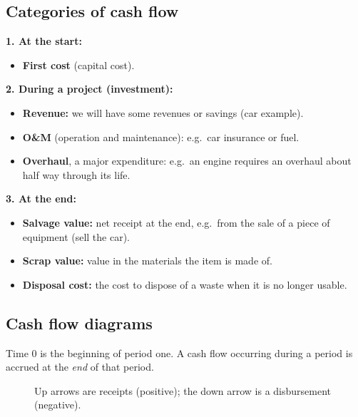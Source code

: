 \documentclass[11pt]{article}
\newcommand{\term}[1]{\textbf{\textcolor{cTerm}{#1}}}
\begin{document}
\subsection*{Categories of cash flow}

\textbf{1. At the start:}
\begin{itemize}[nosep]
  \item \term{First cost} (capital cost).
\end{itemize}

\textbf{2. During a project (investment):}
\begin{itemize}[nosep]
  \item \term{Revenue:} we will have some revenues or savings (car example).
  \item \term{O\&M} (operation and maintenance): e.g.\ car insurance or fuel.
  \item \term{Overhaul}, a major expenditure: e.g.\ an engine requires an
        overhaul about half way through its life.
\end{itemize}

\textbf{3. At the end:}
\begin{itemize}[nosep]
  \item \term{Salvage value:} net receipt at the end, e.g.\ from the sale of a
        piece of equipment (sell the car).
  \item \term{Scrap value:} value in the materials the item is made of.
  \item \term{Disposal cost:} the cost to dispose of a waste when it is no
        longer usable.
\end{itemize}

\subsection*{Cash flow diagrams}
Time $0$ is the beginning of period one. A cash flow occurring during a period is
accrued at the \emph{end} of that period.

\begin{figure}[h]
\centering
{}
\caption*{Up arrows are receipts (positive); the down arrow is a disbursement (negative).}
\end{figure}
\end{document}
